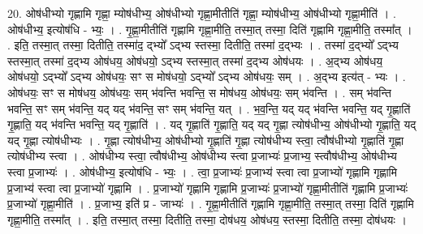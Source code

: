 \documentclass[17pt]{extarticle}
\begin{document}
20. ओष॑धीभ्यो गृह्णामि गृह्णा॒ म्योष॑धीभ्य॒ ओष॑धीभ्यो गृह्णा॒मीतीति॑ गृह्णा॒ म्योष॑धीभ्य॒ ओष॑धीभ्यो गृह्णा॒मीति॑ । . ओष॑धीभ्य॒ इत्योष॑धि - भ्यः॒ । . गृ॒ह्णा॒मीतीति॑ गृह्णामि गृह्णा॒मीति॒ तस्मा॒त् तस्मा॒ दिति॑ गृह्णामि गृह्णा॒मीति॒ तस्मा᳚त् । . इति॒ तस्मा॒त् तस्मा॒ दितीति॒ तस्मा॑द॒ द्भ्यो᳚ ऽद्भ्य स्तस्मा॒ दितीति॒ तस्मा॑ द॒द्भ्यः । . तस्मा॑ द॒द्भ्यो᳚ ऽद्भ्य स्तस्मा॒त् तस्मा॑ द॒द्भ्य ओष॑धय॒ ओष॑धयो॒ ऽद्भ्य स्तस्मा॒त् तस्मा॑ द॒द्भ्य ओष॑धयः । . अ॒द्भ्य ओष॑धय॒ ओष॑धयो॒ ऽद्भ्यो᳚ ऽद्भ्य ओष॑धयः॒ सꣳ स मोष॑धयो॒ ऽद्भ्यो᳚ ऽद्भ्य ओष॑धयः॒ सम् । . अ॒द्भ्य इत्य॑त् - भ्यः । . ओष॑धयः॒ सꣳ स मोष॑धय॒ ओष॑धयः॒ सम् भ॑वन्ति भवन्ति॒ स मोष॑धय॒ ओष॑धयः॒ सम् भ॑वन्ति । . सम् भ॑वन्ति भवन्ति॒ सꣳ सम् भ॑वन्ति॒ यद् यद् भ॑वन्ति॒ सꣳ सम् भ॑वन्ति॒ यत् । . भ॒व॒न्ति॒ यद् यद् भ॑वन्ति भवन्ति॒ यद् गृ॒ह्णाति॑ गृ॒ह्णाति॒ यद् भ॑वन्ति भवन्ति॒ यद् गृ॒ह्णाति॑ । . यद् गृ॒ह्णाति॑ गृ॒ह्णाति॒ यद् यद् गृ॒ह्णा त्योष॑धीभ्य॒ ओष॑धीभ्यो गृ॒ह्णाति॒ यद् यद् गृ॒ह्णा त्योष॑धीभ्यः । . गृ॒ह्णा त्योष॑धीभ्य॒ ओष॑धीभ्यो गृ॒ह्णाति॑ गृ॒ह्णा त्योष॑धीभ्य स्त्वा॒ त्वौष॑धीभ्यो गृ॒ह्णाति॑ गृ॒ह्णा त्योष॑धीभ्य स्त्वा । . ओष॑धीभ्य स्त्वा॒ त्वौष॑धीभ्य॒ ओष॑धीभ्य स्त्वा प्र॒जाभ्यः॑ प्र॒जाभ्य॒ स्त्वौष॑धीभ्य॒ ओष॑धीभ्य स्त्वा प्र॒जाभ्यः॑ । . ओष॑धीभ्य॒ इत्योष॑धि - भ्यः॒ । . त्वा॒ प्र॒जाभ्यः॑ प्र॒जाभ्य॑ स्त्वा त्वा प्र॒जाभ्यो॑ गृह्णामि गृह्णामि प्र॒जाभ्य॑ स्त्वा त्वा प्र॒जाभ्यो॑ गृह्णामि । . प्र॒जाभ्यो॑ गृह्णामि गृह्णामि प्र॒जाभ्यः॑ प्र॒जाभ्यो॑ गृह्णा॒मीतीति॑ गृह्णामि प्र॒जाभ्यः॑ प्र॒जाभ्यो॑ गृह्णा॒मीति॑ । . प्र॒जाभ्य॒ इति॑ प्र - जाभ्यः॑ । . गृ॒ह्णा॒मीतीति॑ गृह्णामि गृह्णा॒मीति॒ तस्मा॒त् तस्मा॒ दिति॑ गृह्णामि गृह्णा॒मीति॒ तस्मा᳚त् । . इति॒ तस्मा॒त् तस्मा॒ दितीति॒ तस्मा॒ दोष॑धय॒ ओष॑धय॒ स्तस्मा॒ दितीति॒ तस्मा॒ दोष॑धयः । \newline
\end{document}
